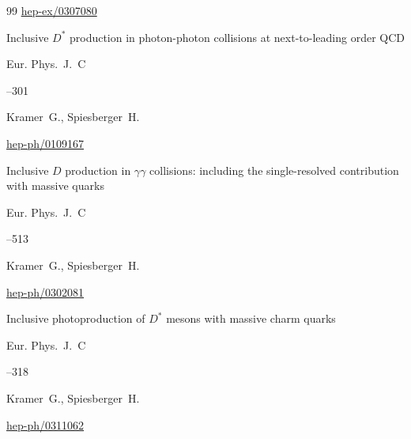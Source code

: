 \begin{thebibliography}{99}
\arxiv \href{http://arxiv.org/abs/hep-ex/0307080}{hep-ex/0307080}




\paper Inclusive $D^*$ production in photon-photon collisions at next-to-leading order QCD


\jour Eur. Phys.~J.~C 



--301

\by Kramer~G., Spiesberger~H.


\arxiv \href{http://arxiv.org/abs/hep-ph/0109167}{hep-ph/0109167}






\paper Inclusive $D$ production in $\gamma \gamma$ collisions: including the single-resolved contribution with massive quarks


\jour Eur. Phys.~J.~C 



--513

\by Kramer~G., Spiesberger~H.


\arxiv \href{http://arxiv.org/abs/hep-ph/0302081}{hep-ph/0302081}




\paper Inclusive photoproduction of $D^*$ mesons with massive charm quarks


\jour Eur. Phys.~J.~C 



--318

\by Kramer~G., Spiesberger~H.


\arxiv \href{http://arxiv.org/abs/hep-ph/0311062}{hep-ph/0311062}







\end{thebibliography}

